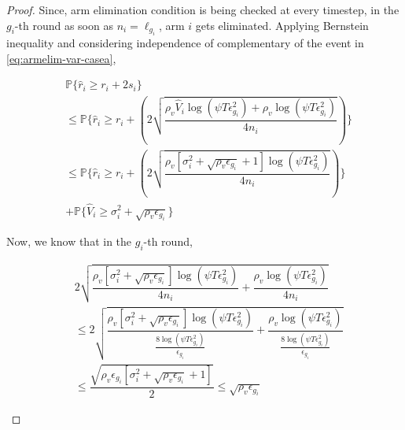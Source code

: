 \begin{proof}
Since, arm elimination condition is being checked at every timestep, in the $g_{i}$-th round as soon as $n_{i}=\ell_{g_{i}}$, arm $i$ gets eliminated. Applying Bernstein inequality and considering independence of complementary of the event in \ref{eq:armelim-var-casea},
\begin{small}
\begin{align}
&\mathbb{P}\lbrace\hat{r}_{i}\geq r_{i} + 2s_{i}\rbrace\\
&\leq \mathbb{P}\bigg\lbrace \hat{r}_{i} \geq r_{i}+ ( 2\sqrt{\dfrac{\rho_v \hat{V}_{i}\log(\psi T\epsilon_{g_{i}}^{2}) + \rho_v \log{(\psi T\epsilon_{g_{i}}^{2})}}{4n_{i}} }) \bigg\rbrace\\
&\leq \mathbb{P}\bigg\lbrace \hat{r}_{i} \geq r_{i}+ (2\sqrt{\dfrac{\rho_v [\sigma_{i}^{2}+\sqrt{\rho_{v}\epsilon_{g_{i}}} + 1]\log(\psi T\epsilon_{g_{i}}^{2})}{4n_{i}}})\bigg\rbrace \label{eq:prob_eq1}\\ 
&+ \mathbb{P}\bigg\lbrace \hat{V}_{i}\geq \sigma_{i}^{2}+\sqrt{\rho_{v}\epsilon_{g_{i}}}\bigg\rbrace \label{eq:prob_eq2}
\end{align}
\end{small}
 
 
Now, we know that in the $g_{i}$-th round,
\begin{small}
\begin{align*}
& 2\sqrt{\dfrac{\rho_v [\sigma_{i}^{2}+\sqrt{\rho_{v}\epsilon_{g_{i}}}]\log(\psi T\epsilon_{g_{i}}^{2})}{4n_{i}} + \dfrac{\rho_v \log{(\psi T\epsilon_{g_{i}}^{2})}}{4 n_{i}}}\\ &\leq  2\sqrt{\dfrac{\rho_v [\sigma_{i}^{2}+\sqrt{\rho_{v}\epsilon_{g_{i}}}]\log(\psi T\epsilon_{g_{i}}^{2})}{\frac{8\log(\psi T \epsilon_{g_{i}}^{2})}{\epsilon_{g_{i}}}} + \dfrac{\rho_v \log{(\psi T\epsilon_{g_{i}}^{2})}}{\frac{8\log(\psi T \epsilon_{g_{i}}^{2})}{\epsilon_{g_{i}}}}}\\
& \leq \dfrac{\sqrt{\rho_v \epsilon_{g_{i}}[\sigma_{i}^{2}+\sqrt{\rho_{v}\epsilon_{g_{i}}} + 1]}}{2}\leq \sqrt{\rho_v \epsilon_{g_{i}}}
\end{align*}
\end{small}



\end{proof}
